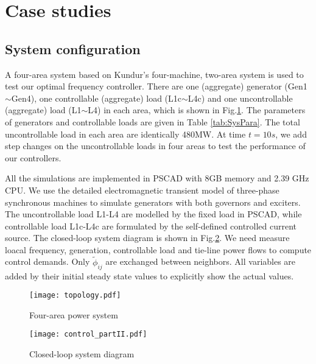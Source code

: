 \section{Case studies}
\subsection{System configuration}
A four-area system based on Kundur's four-machine, two-area system \cite{Fang:Design} \cite{Kundur:Power} is used to test our optimal frequency controller. There are one (aggregate) generator (Gen1$\sim$Gen4), one controllable (aggregate) load (L1c$\sim$L4c) and one uncontrollable (aggregate) load (L1$\sim$L4) in each area, which is shown in Fig.\ref{fig:system}. The parameters of generators and controllable loads are given in Table \ref{tab:SysPara}. The total uncontrollable load in each area are identically 480MW. At time $t=10s$, we add step changes on the uncontrollable loads in four areas to test the performance of our controllers. 

All the simulations are implemented in PSCAD \cite{website:PSCAD} with 8GB memory and 2.39 GHz CPU.  We use the detailed electromagnetic transient model of three-phase synchronous machines to simulate generators with both governors and exciters.  The uncontrollable load L1-L4 are modelled by the fixed load in PSCAD, while controllable load L1c-L4c are formulated by the self-defined controlled current source. The closed-loop system diagram is shown in Fig.\ref{fig:control2}. We need measure loacal frequency, generation, controllable load and tie-line power flows to compute control demands. Only $\tilde{\phi}_{ij}$ are exchanged between neighbors. All variables are added by their initial steady state values to explicitly show the actual values.
\begin{figure}[htp]
        \centering
        \texttt{[image: topology.pdf]}
        \caption{Four-area power system}
        \label{fig:system}
\end{figure}

\begin{figure}[htp]
	\centering
	\texttt{[image: control\_partII.pdf]}
	\caption{Closed-loop system diagram}
	\label{fig:control2}
\end{figure}




